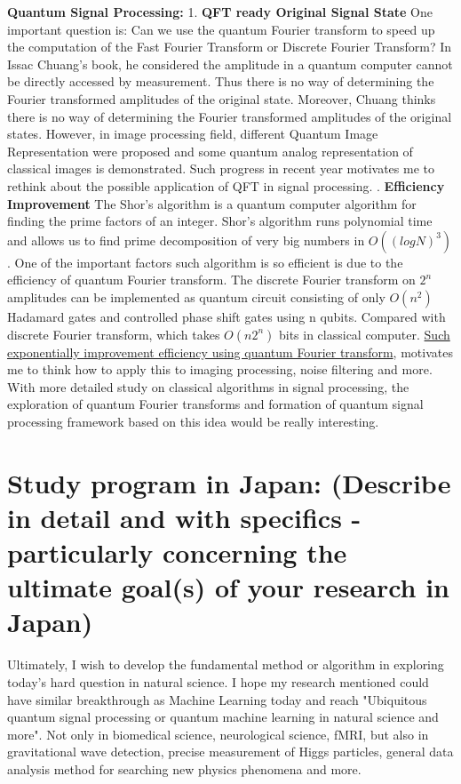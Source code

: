 \documentclass{article}
\begin{document}
\textbf{Quantum Signal Processing:} 
1. \textbf{QFT ready Original Signal State } One important question is: 
Can we use the quantum Fourier transform to speed up the 
computation of the Fast Fourier Transform or Discrete Fourier Transform? 
In Issac Chuang's book, he considered the amplitude in a quantum 
computer cannot be directly accessed by measurement. Thus there is 
no way of determining the Fourier transformed amplitudes of the original 
state. Moreover, Chuang thinks there is no way of determining the Fourier transformed 
amplitudes of the original states. However, in image processing field, 
different Quantum Image Representation were proposed and some quantum analog 
representation of classical images is demonstrated. Such progress in recent 
year motivates me to rethink about the possible application of QFT in 
signal processing.   . \textbf{Efficiency Improvement} The Shor's algorithm is a 
quantum computer algorithm for finding the prime factors of an integer. 
Shor's algorithm runs polynomial time and allows us to find prime decomposition of very big 
numbers in $O ((log N)^3)$. One of the important factors such algorithm is so efficient is 
due to the efficiency of quantum Fourier transform. The discrete Fourier transform on 
$2^n$ amplitudes can be implemented as quantum circuit consisting of only $O(n^2)$ Hadamard gates
and controlled phase shift gates using n qubits. Compared with discrete Fourier transform, 
which takes $O(n 2^n )$ bits in classical computer. \underline{Such exponentially improvement 
efficiency using quantum Fourier transform}, motivates me to think how to apply this 
to imaging processing, noise filtering and more. With more detailed study on 
classical algorithms in signal processing, the exploration of quantum 
Fourier transforms and formation of quantum signal processing framework based on 
this idea would be really interesting. 


\section{Study program in Japan:
(Describe in detail and with specifics - particularly
concerning the ultimate goal(s) of your research in Japan)
}

Ultimately, I wish to develop the fundamental method or 
algorithm in exploring today's 
hard question in natural science. I hope my research mentioned 
could have similar breakthrough as Machine Learning today and 
reach "Ubiquitous quantum signal processing or 
quantum machine learning in natural science and more". 
Not only in biomedical science, 
neurological science, fMRI, but also in gravitational 
wave detection, precise measurement of Higgs particles, general 
data analysis method for searching new physics phenomena and more. 
\end{document}
